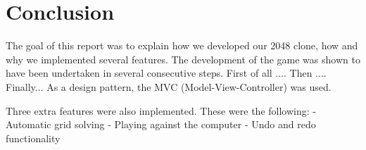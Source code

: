 \documentclass[a4paper,11pt,report]{scrartcl}
\begin{document}
\newpage\section{Conclusion}


The goal of this report was to explain how we developed our 2048 clone, how and why we implemented several features. 
The development of the game was shown to have been undertaken in several consecutive steps. First of all .... Then .... Finally...
As a design pattern, the MVC (Model-View-Controller) was used.

Three extra features were also implemented. These were the following: 
- Automatic grid solving 
- Playing against the computer 
- Undo and redo functionality
\end{document}
